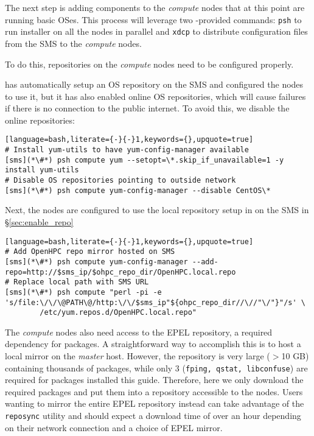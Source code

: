 
The next step is adding \OHPC{} components to the {\em compute} nodes that at this
point are running basic OSes.  This process will leverage two \xCAT{}-provided
commands: \texttt{psh} to run \texttt{\pkgmgr{}} installer on all the
nodes in parallel  and \texttt{xdcp} to distribute configuration files from the
SMS to the {\em compute} nodes. 

\noindent To do this, repositories on the {\em compute} nodes need to be configured
properly. 

\xCAT{} has automatically setup an  OS repository on the SMS and configured the
nodes to use it, but it has  also enabled online OS repositories, which will
cause  \texttt{\pkgmgr{}} failures if there is no connection to the public internet. 
To avoid this, we disable the online repositories:

\begin{lstlisting}[language=bash,literate={-}{-}1,keywords={},upquote=true]
# Install yum-utils to have yum-config-manager available
[sms](*\#*) psh compute yum --setopt=\*.skip_if_unavailable=1 -y install yum-utils
# Disable OS repositories pointing to outside network
[sms](*\#*) psh compute yum-config-manager --disable CentOS\*
\end{lstlisting}

\noindent Next, the nodes are configured to use the local \OHPC{} repository
setup in on the SMS in \S\ref{sec:enable_repo}

\begin{lstlisting}[language=bash,literate={-}{-}1,keywords={},upquote=true]
# Add OpenHPC repo mirror hosted on SMS
[sms](*\#*) psh compute yum-config-manager --add-repo=http://$sms_ip/$ohpc_repo_dir/OpenHPC.local.repo
# Replace local path with SMS URL
[sms](*\#*) psh compute "perl -pi -e 's/file:\/\/\@PATH\@/http:\/\/$sms_ip"${ohpc_repo_dir//\//"\/"}"/s' \
        /etc/yum.repos.d/OpenHPC.local.repo"
\end{lstlisting}

The {\em compute} nodes also need access to the EPEL repository, a required
dependency for \OHPC{} packages. A straightforward way to accomplish this is to
host a local mirror on the {\em master} host. However, the repository is very
large ($>$10 GB) containing thousands of packages, while only 3 (\texttt{fping,
qstat, libconfuse}) are required for packages installed this guide.  Therefore,
here we only download the required packages and put them into a repository
accessible to the nodes.  Users wanting to mirror the entire EPEL repository
instead can take advantage of the \texttt{reposync} utility and should expect a
download time of over an hour depending on their network connection and a choice
of EPEL mirror.

